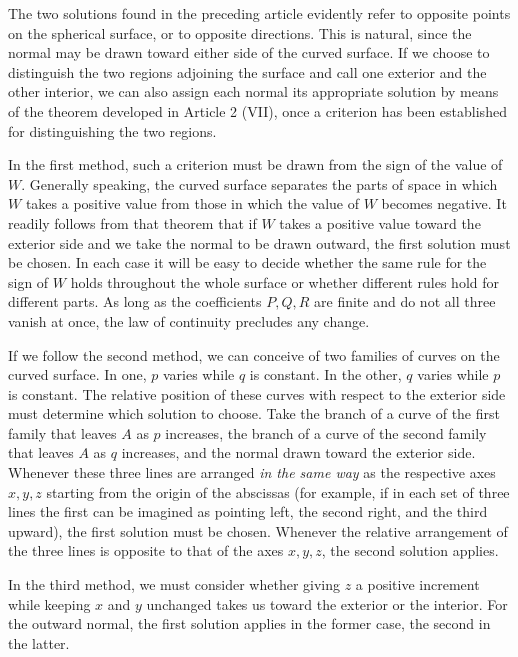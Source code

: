 %
\indent The two solutions found in the preceding article evidently refer to opposite points on the spherical surface, or to opposite directions. This is natural, since the normal may be drawn toward either side of the curved surface. If we choose to distinguish the two regions adjoining the surface and call one exterior and the other interior, we can also assign each normal its appropriate solution by means of the theorem developed in Article 2 (VII), once a criterion has been established for distinguishing the two regions.

In the first method, such a criterion must be drawn from the sign of the value of \(W\). Generally speaking, the curved surface separates the parts of space in which \(W\) takes a positive value from those in which the value of \(W\) becomes negative. It readily follows from that theorem that if \(W\) takes a positive value toward the exterior side and we take the normal to be drawn outward, the first solution must be chosen. In each case it will be easy to decide whether the same rule for the sign of \(W\) holds throughout the whole surface or whether different rules hold for different parts. As long as the coefficients \(P,Q,R\) are finite and do not all three vanish at once, the law of continuity precludes any change.

If we follow the second method, we can conceive of two families of curves on the curved surface. In one, \(p\) varies while \(q\) is constant. In the other, \(q\) varies while \(p\) is constant. The relative position of these curves with respect to the exterior side must determine which solution to choose. Take the branch of a curve of the first family that leaves \(A\) as \(p\) increases, the branch of a curve of the second family that leaves \(A\) as \(q\) increases, and the normal drawn toward the exterior side. Whenever these three lines are arranged \textit{in the same way} as the respective axes \(x,y,z\) starting from the origin of the abscissas (for example, if in each set of three lines the first can be imagined as pointing left, the second right, and the third upward), the first solution must be chosen. Whenever the relative arrangement of the three lines is opposite to that of the axes \(x,y,z\), the second solution applies.

In the third method, we must consider whether giving \(z\) a positive increment while keeping \(x\) and \(y\) unchanged takes us toward the exterior or the interior. For the outward normal, the first solution applies in the former case, the second in the latter.
